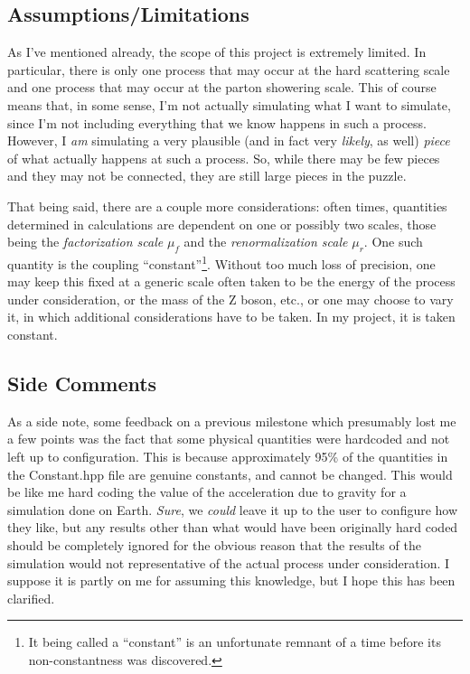 \subsection{Assumptions/Limitations}

As I've mentioned already, the scope of this project is extremely limited. In particular, there is only one process that may occur at the hard scattering scale and one process that may occur at the parton showering scale. This of course means that, in some sense, I'm not actually simulating what I want to simulate, since I'm not including everything that we know happens in such a process. However, I \textit{am} simulating a very plausible (and in fact very \textit{likely}, as well) \textit{piece} of what actually happens at such a process. So, while there may be few pieces and they may not be connected, they are still large pieces in the puzzle.

That being said, there are a couple more considerations: often times, quantities determined in calculations are dependent on one or possibly two scales, those being the \textit{factorization scale} $\mu_f$ and the \textit{renormalization scale} $\mu_r$. One such quantity is the coupling ``constant''\footnote{It being called a ``constant'' is an unfortunate remnant of a time before its non-constantness was discovered.}. Without too much loss of precision, one may keep this fixed at a generic scale often taken to be the energy of the process under consideration, or the mass of the Z boson, etc., or one may choose to vary it, in which additional considerations have to be taken. In my project, it is taken constant.

\subsection{Side Comments}

As a side note, some feedback on a previous milestone which presumably lost me a few points was the fact that some physical quantities were hardcoded and not left up to configuration. This is because approximately 95\% of the quantities in the Constant.hpp file are genuine constants, and cannot be changed. This would be like me hard coding the value of the acceleration due to gravity for a simulation done on Earth. \textit{Sure}, we \textit{could} leave it up to the user to configure how they like, but any results other than what would have been originally hard coded should be completely ignored for the obvious reason that the results of the simulation would not representative of the actual process under consideration. I suppose it is partly on me for assuming this knowledge, but I hope this has been clarified.

